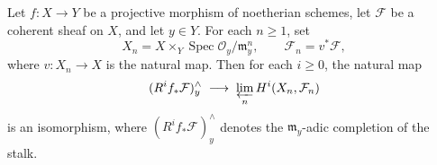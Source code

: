 Let $f: X \to Y$ be a projective morphism of noetherian schemes, let $\mathcal{F}$ be a coherent sheaf on $X$, and let $y \in Y$. For each $n \ge 1$, set
$$X_n = X \times_Y \operatorname{Spec} \mathcal{O}_y / \mathfrak{m}_y^n, \qquad \mathcal{F}_n = v^* \mathcal{F},$$
where $v: X_n \to X$ is the natural map. Then for each $i \ge 0$, the natural map
$$(R^i f_* \mathcal{F})_y^{\wedge} \;\longrightarrow\; \varprojlim_n H^i(X_n, \mathcal{F}_n)$$
is an isomorphism, where $(R^i f_* \mathcal{F})_y^{\wedge}$ denotes the $\mathfrak{m}_y$-adic completion of the stalk.
